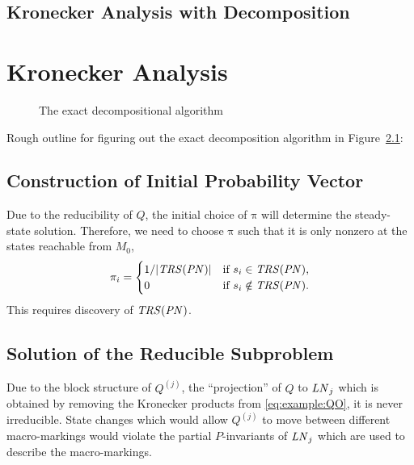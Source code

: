 \documentclass[a4paper,10pt,twoside,openright]{memoir}
\newcommand*{\PN}{\textnormal{\emph{PN}}}
\newcommand*{\LN}{\textnormal{\emph{LN}}}
\renewcommand*{\vec}[1]{\boldsymbol{\mathrm{#1}}}
\newcommand*{\TRS}{\textnormal{\emph{TRS}}}
\begin{document}
\section{Kronecker Analysis with Decomposition}

\chapter{Kronecker Analysis}

\begin{figure}
  {\centering
    
    \par}
  \caption{The exact decompositional algorithm}
  \label{fig:kronecker:flowchart}
\end{figure}

Rough outline for figuring out the exact decomposition algorithm
\citep{bao2008decompositional} in Figure~\ref{fig:kronecker:flowchart}:

\section{Construction of Initial Probability Vector}

Due to the reducibility of $Q$, the initial choice of $\vec{\pi}$ will
determine the steady-state solution. Therefore, we need to choose
$\vec{\pi}$ such that it is only nonzero at the states reachable from
$M_0$,
\begin{equation}
  \pi_i = \begin{cases}
    1 / \lvert \TRS(\PN) \rvert & \text{if $s_i \in \TRS(\PN)$,} \\
    0 & \text{if $s_i \notin \TRS(\PN)$.} \\
  \end{cases}
\end{equation}
This requires discovery of $\TRS(\PN)$.

\section{Solution of the Reducible Subproblem}

Due to the block structure of $Q^{(j)}$, the ``projection'' of $Q$ to
$\LN_j$ which is obtained by removing the Kronecker products from
\eqref{eq:example:QO}, it is never irreducible. State changes which
would allow $Q^{(j)}$ to move between different macro-markings would violate
the partial $P$-invariants of $\LN_j$ which are used to describe the
macro-markings.
\end{document}
